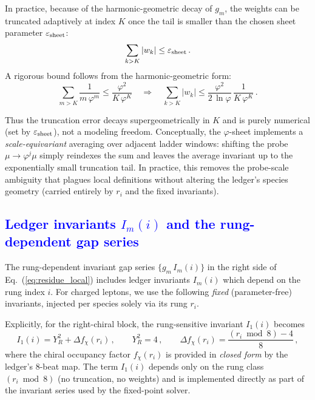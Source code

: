 \documentclass[%
amsmath,amssymb,
aps,
prb,
floatfix,showkeys
]{revtex4-2}
\newcommand{\modif}[1]{\textcolor{blue}{#1}}
\begin{document}
In practice, because of the harmonic-geometric decay of $g_m$, the weights can be truncated adaptively at index $K$ once the tail is smaller than the chosen sheet parameter $\varepsilon_{\rm sheet}$:
\begin{equation}
  \sum_{k>K} |w_k| \le \varepsilon_{\rm sheet}\,.
  \label{eq:sheet_tail_bound_condition}
\end{equation}
A rigorous bound follows from the harmonic-geometric form:
\begin{equation}
 \sum_{m>K}\frac{1}{m\,\varphi^m}
\le \frac{\varphi^2}{K\,\varphi^{K}}
\quad\Rightarrow\quad
 \sum_{k>K} |w_k| \le \frac{\varphi^{2}}{2\,\ln\varphi}\,\frac{1}{K\,\varphi^{K}}\,.
  \label{eq:sheet_tail_bound}
\end{equation}

Thus the truncation error decays supergeometrically in $K$ and is purely numerical (set by $\varepsilon_{\rm sheet}$), not a modeling freedom. Conceptually, the $\varphi$-sheet implements a \emph{scale-equivariant} averaging over adjacent ladder windows: shifting the probe $\mu\!\to\!\varphi^j\mu$ simply reindexes the sum and leaves the average invariant up to the exponentially small truncation tail. In practice, this removes the probe-scale ambiguity that plagues local definitions without altering the ledger's species geometry (carried entirely by $r_i$ and the fixed invariants).

{\modif{\subsection{Ledger invariants $I_m(i)$ and the rung-dependent gap series}
\label{subsec:ledger-invariants}}}

The rung-dependent invariant gap series $\{g_m\,I_m(i)\}$ in the right side of Eq.~(\ref{eq:residue_local}) includes ledger invariants $I_m(i)$ which depend on the rung index $i$. For charged leptons, we use the following \emph{fixed} (parameter-free) invariants, injected per species solely via its rung $r_i$.

Explicitly, for the right-chiral block, the rung-sensitive invariant $I_1(i)$ becomes
\begin{equation}
  I_1(i) = Y_R^2 + \Delta f_\chi(r_i)\,, \qquad Y_R^2 = 4\,, \qquad 
  \Delta f_\chi(r_i) = \frac{(r_i\bmod 8) - 4}{8}\,,
  \label{eq:I1_def}
\end{equation}
where the chiral occupancy factor $f_\chi(r_i)$ is provided in \emph{closed form} by the ledger's 8-beat map. The term $I_1(i)$ depends only on the rung class $(r_i\bmod 8)$ (no truncation, no weights) and is implemented directly as part of the invariant series used by the fixed-point solver.
\end{document}
